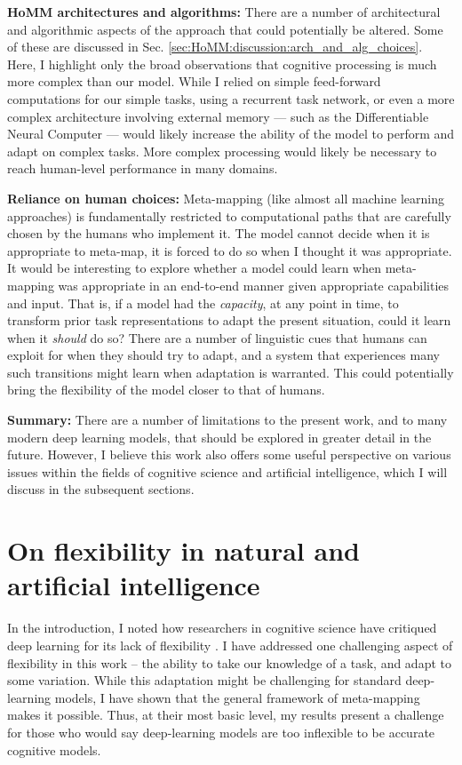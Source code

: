 \textbf{HoMM architectures and algorithms:} There are a number of architectural and algorithmic aspects of the approach that could potentially be altered. Some of these are discussed in Sec. \ref{sec:HoMM:discussion:arch_and_alg_choices}. Here, I highlight only the broad observations that cognitive processing is much more complex than our model. While I relied on simple feed-forward computations for our simple tasks, using a recurrent task network, or even a more complex architecture involving external memory --- such as the Differentiable Neural Computer \citep{Graves2016} --- would likely increase the ability of the model to perform and adapt on complex tasks. More complex processing would likely be necessary to reach human-level performance in many domains.\par 

\textbf{Reliance on human choices:} Meta-mapping (like almost all machine learning approaches) is fundamentally restricted to computational paths that are carefully chosen by the humans who implement it. The model cannot decide when it is appropriate to meta-map, it is forced to do so when I thought it was appropriate. It would be interesting to explore whether a model could learn when meta-mapping was appropriate in an end-to-end manner given appropriate capabilities and input. That is, if a model had the \emph{capacity}, at any point in time, to transform prior task representations to adapt the present situation, could it learn when it \emph{should} do so? There are a number of linguistic cues that humans can exploit for when they should try to adapt, and a system that experiences many such transitions might learn when adaptation is warranted. This could potentially bring the flexibility of the model closer to that of humans.\par 

\textbf{Summary:} There are a number of limitations to the present work, and to many modern deep learning models, that should be explored in greater detail in the future. However, I believe this work also offers some useful perspective on various issues within the fields of cognitive science and artificial intelligence, which I will discuss in the subsequent sections. 


\section{On flexibility in natural and artificial intelligence}

In the introduction, I noted how researchers in cognitive science have critiqued deep learning for its lack of flexibility \citep[e.g.][]{Lake2015, Lake2016, Lake2017, Marcus2018}. I have addressed one challenging aspect of flexibility in this work -- the ability to take our knowledge of a task, and adapt to some variation. While this adaptation might be challenging for standard deep-learning models, I have shown that the general framework of meta-mapping makes it possible. Thus, at their most basic level, my results present a challenge for those who would say deep-learning models are too inflexible to be accurate cognitive models. \par  

